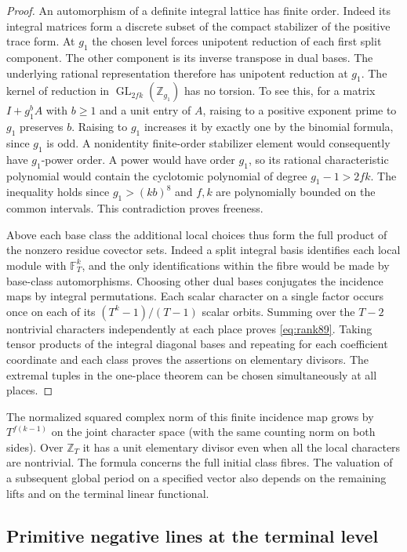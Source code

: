 \documentclass[a4paper,11pt]{article}
\theoremstyle{definition}
\theoremstyle{remark}
\newcommand{\ZZ}{\mathbb Z}\newcommand{\ord}{\operatorname{ord}}
\numberwithin{equation}{section}
\newcommand{\GL}{\operatorname{GL}}
\begin{document}
\begin{proof}
An automorphism of a definite integral lattice has finite order.
Indeed its integral matrices form a discrete subset of the
compact stabilizer of the positive trace form. At \(g_1\) the
chosen level forces unipotent reduction of each first split
component. The other component is its inverse transpose in
dual bases. The underlying rational representation therefore
has unipotent reduction at \(g_1\). The kernel of reduction in
\(\GL_{2fk}(\ZZ_{g_1})\) has no torsion. To see this, for a
matrix \(I+g_1^b A\) with \(b\ge1\) and a unit entry of \(A\),
raising to a positive exponent prime to \(g_1\) preserves \(b\).
Raising to \(g_1\) increases it by exactly one by the binomial
formula, since \(g_1\) is odd. A nonidentity finite-order
stabilizer element would consequently have \(g_1\)-power order.
A power would have order \(g_1\), so its rational characteristic
polynomial would contain the cyclotomic polynomial of degree
\(g_1-1>2fk\). The inequality holds since
\(g_1>(kb)^8\) and \(f,k\) are polynomially bounded on the
common intervals. This contradiction proves freeness.

Above each base class the additional local choices thus form
the full product of the nonzero residue covector sets. Indeed
a split integral basis identifies each local module with
\(\mathbb F_T^k\), and the only identifications within the fibre
would be made by base-class automorphisms. Choosing other
dual bases conjugates the incidence maps by integral
permutations. Each scalar character on a single factor occurs
once on each of its \((T^k-1)/(T-1)\) scalar orbits. Summing
over the \(T-2\) nontrivial characters independently at each
place proves \eqref{eq:rank89}. Taking tensor products of the
integral diagonal bases and repeating for each coefficient
coordinate and each class proves the assertions on elementary
divisors. The extremal tuples in the one-place theorem can be
chosen simultaneously at all places.
\end{proof}

The normalized squared complex norm of this finite incidence
map grows by \(T^{f(k-1)}\) on the joint character space (with
the same counting norm on both sides). Over \(\ZZ_T\) it has a
unit elementary divisor even when all the local characters are
nontrivial. The formula concerns the full initial class fibres.
The valuation of a subsequent global period on a specified
vector also depends on the remaining lifts and on the terminal
linear functional.

\subsection{Primitive negative lines at the terminal level}\label{nav:VI-07}
\label{sec:line92}
\end{document}
